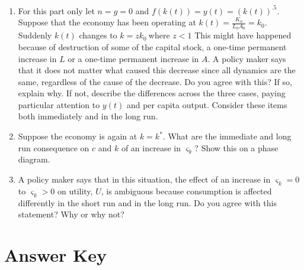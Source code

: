 \documentclass[12pt]{article}
\begin{document}
\begin{enumerate}
\begin{enumerate}
\item For this part only let $n=g=0$ and $f\left( k\left( t\right) \right)
=y\left( t\right) =\left( k\left( t\right) \right) ^{.5}$. Suppose that the
economy has been operating at $k\left( t\right) =\frac{K_{0}}{L_{0}A_{0}}%
=k_{0}.$ Suddenly $k\left( t\right) $ changes to $k=zk_{0}\ $where $z<1$
This might have happened because of destruction of some of the capital
stock, a one-time permanent increase in $L$ or a one-time permanent increase
in $A$. A policy maker says that it does not matter what caused this
decrease since all dynamics are the same, regardless of the cause of the
decrease. Do you agree with this? If so, explain why. If not, describe the
differences across the three cases, paying particular attention to $y\left(
t\right) $ and per capita output. Consider these items both immediately and
in the long run.

\item Suppose the economy is again at $k=k^{\ast }.$ What are the immediate
and long run consequence on $c$ and $k$ of an increase in $\varsigma _{k}?$
Show this on a phase diagram.

\item A policy maker says that in this situation, the effect of an increase
in $\varsigma _{k}=0$ to $\varsigma _{k}>0$ on utility, $U$, is ambiguous
because consumption is affected differently in the short run and in the long
run. Do you agree with this statement? Why or why not?\end{enumerate}
\end{enumerate}

\section*{Answer Key}
\end{document}
